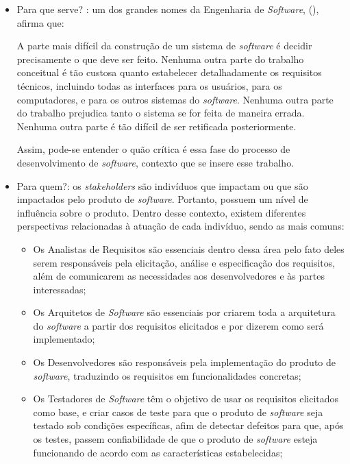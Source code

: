 \begin{itemize}
    \item Para que serve? : um dos grandes nomes da Engenharia de \textit{Software}, (\citeyear{brooks1995mythical}), afirma que:
        \begin{citacao}
            A parte mais difícil da construção de um sistema de \textit{software} é decidir precisamente o que deve ser feito. Nenhuma outra parte do trabalho conceitual é tão custosa quanto estabelecer detalhadamente os requisitos técnicos, incluindo todas as interfaces para os usuários, para os computadores, e para os outros sistemas do \textit{software}. Nenhuma outra parte do trabalho prejudica tanto o sistema se for feita de maneira errada. Nenhuma outra parte é tão difícil de ser retificada posteriormente.
        \end{citacao}
    Assim, pode-se entender o quão crítica é essa fase do processo de desenvolvimento de \textit{software}, contexto que se insere esse trabalho.
    
    \item Para quem?: os \textit{stakeholders} são indivíduos que impactam ou que são impactados pelo produto de \textit{software}. Portanto, possuem um nível de influência sobre o produto. Dentro desse contexto, existem diferentes perspectivas relacionadas à atuação de cada indivíduo, sendo as mais comuns:
    
    \begin{itemize}
        \item Os Analistas de Requisitos são essenciais dentro dessa área pelo fato deles serem responsáveis pela elicitação, análise e especificação dos requisitos, além de comunicarem as necessidades aos desenvolvedores e às partes interessadas;
    
        \item Os Arquitetos de \textit{Software} são essenciais por criarem toda a arquitetura do \textit{software} a partir dos requisitos elicitados e por dizerem como será implementado;
    
        \item Os Desenvolvedores são responsáveis pela implementação do produto de \textit{software}, traduzindo os requisitos em funcionalidades concretas;
    
        \item Os Testadores de \textit{Software} têm o objetivo de usar os requisitos elicitados como base, e criar casos de teste para que o produto de \textit{software} seja testado sob condições específicas, afim de detectar defeitos para que, após os testes, passem confiabilidade de que o produto de \textit{software} esteja funcionando de acordo com as características estabelecidas;
    

\end{itemize}
\end{itemize}

